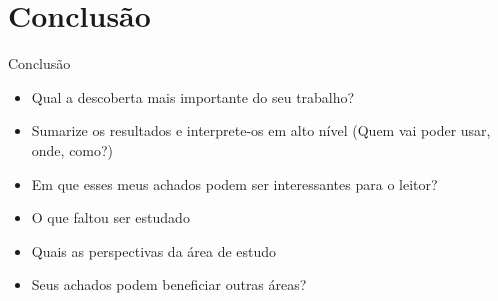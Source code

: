 \section{Conclusão}

\begin{frame}	
	\begin{block}{Conclusão}
		 \begin{itemize}
			  \item Qual a descoberta mais importante do seu trabalho?			  
			  \item Sumarize os resultados e interprete-os em alto nível (Quem vai poder usar, onde, como?)
			  \item Em que esses meus achados podem ser interessantes para o leitor?
			  \item O que faltou ser estudado
			  \item Quais as perspectivas da área de estudo
			  \item Seus achados podem beneficiar outras áreas?
		  \end{itemize}
	\end{block}
\end{frame}
